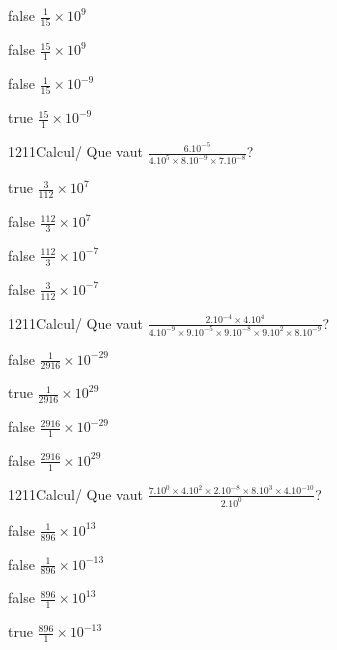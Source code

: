             \begin{reponses}
                \item[false] $\frac{1}{15}\times 10^{9}$
                \item[false] $\frac{15}{1}\times 10^{9}$
                \item[false] $\frac{1}{15}\times 10^{-9}$
                \item[true] $\frac{15}{1}\times 10^{-9}$
            \end{reponses}
            \begin{question}{1211}{Calcul}{}{/}
                Que vaut $\frac{6.10^{-5}}{4.10^{5}\times 8.10^{-9}\times 7.10^{-8}}$?
            \end{question}
            \begin{reponses}
                \item[true] $\frac{3}{112}\times 10^{7}$
                \item[false] $\frac{112}{3}\times 10^{7}$
                \item[false] $\frac{112}{3}\times 10^{-7}$
                \item[false] $\frac{3}{112}\times 10^{-7}$
            \end{reponses}
            \begin{question}{1211}{Calcul}{}{/}
                Que vaut $\frac{2.10^{-4}\times 4.10^{4}}{4.10^{-9}\times 9.10^{-5}\times 9.10^{-8}\times 9.10^{2}\times 8.10^{-9}}$?
            \end{question}
            \begin{reponses}
                \item[false] $\frac{1}{2916}\times 10^{-29}$
                \item[true] $\frac{1}{2916}\times 10^{29}$
                \item[false] $\frac{2916}{1}\times 10^{-29}$
                \item[false] $\frac{2916}{1}\times 10^{29}$
            \end{reponses}
            \begin{question}{1211}{Calcul}{}{/}
                Que vaut $\frac{7.10^{0}\times 4.10^{2}\times 2.10^{-8}\times 8.10^{3}\times 4.10^{-10}}{2.10^{0}}$?
            \end{question}
            \begin{reponses}
                \item[false] $\frac{1}{896}\times 10^{13}$
                \item[false] $\frac{1}{896}\times 10^{-13}$
                \item[false] $\frac{896}{1}\times 10^{13}$
                \item[true] $\frac{896}{1}\times 10^{-13}$
            \end{reponses}
